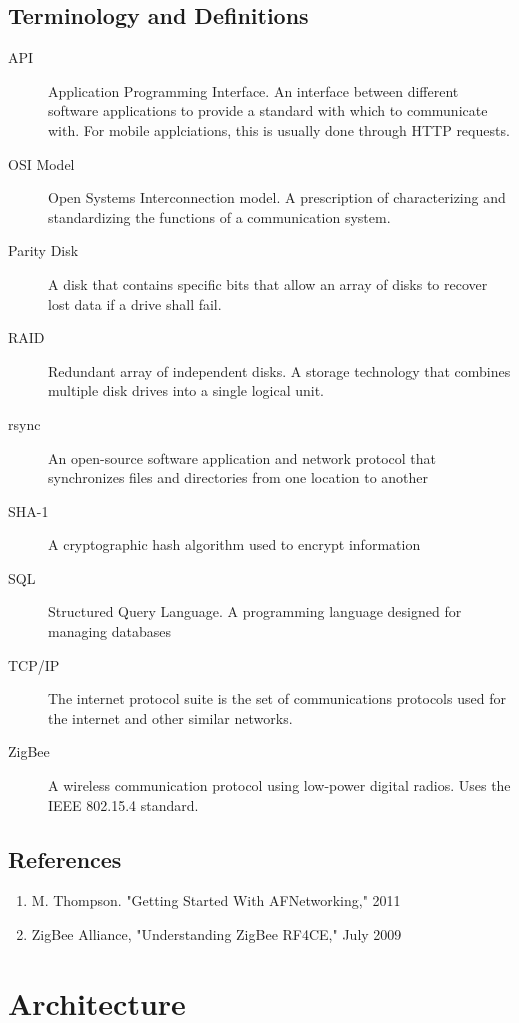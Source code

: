 \documentclass{report}
\begin{document}
\section{Terminology and Definitions}
\begin{description}
\item[API] Application Programming Interface. An interface between different
software applications to provide a standard with which to communicate with. For
mobile applciations, this is usually done through HTTP requests.
\item[OSI Model] Open Systems Interconnection model. A prescription of characterizing
and standardizing the functions of a communication system.
\item[Parity Disk] A disk that contains specific bits that allow an array of disks to recover
lost data if a drive shall fail.
\item[RAID] Redundant array of independent disks. A storage technology that
combines multiple disk drives into a single logical unit.
\item[rsync] An open-source software application and network protocol that synchronizes
files and directories from one location to another
\item[SHA-1] A cryptographic hash algorithm used to encrypt information
\item[SQL] Structured Query Language. A programming language designed for managing
databases
\item[TCP/IP] The internet protocol suite is the set of communications protocols used
for the internet and other similar networks.
\item[ZigBee] A wireless communication protocol using low-power digital radios.
Uses the IEEE 802.15.4 standard.
\end{description}

\section{References}

\begin{enumerate}
    \item M. Thompson. "Getting Started With AFNetworking," 2011
    \item ZigBee Alliance, "Understanding ZigBee RF4CE," July 2009
\end{enumerate}
%

\chapter{Architecture} %
\label{ch:architecture}
\end{document}
